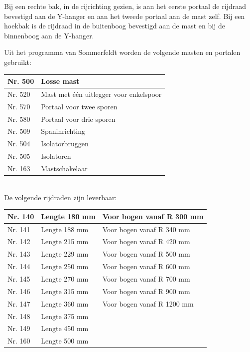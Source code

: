 \documentclass[12pt,a4paper]{report}
\begin{document}
Bij een rechte bak, in de rijrichting gezien, is aan het eerste portaal de rijdraad bevestigd aan de Y-hanger en aan het tweede portaal aan de mast zelf.
Bij een hoekbak is de rijdraad in de buitenboog bevestigd aan de mast en bij de binnenboog aan de Y-hanger.

Uit het programma van Sommerfeldt worden de volgende masten en portalen gebruikt:

\begin{tabular}{| l |p{8cm}|}
\hline
\cellcolor[gray]{0.84}Nr. 500&Losse mast\\
\hline
\cellcolor[gray]{0.84}Nr. 520&Mast met \'{e}\'{e}n uitlegger voor enkelspoor\\
\hline
\cellcolor[gray]{0.84}Nr. 570&Portaal voor twee sporen\\
\hline
\cellcolor[gray]{0.84}Nr. 580&Portaal voor drie sporen\\
\hline
\cellcolor[gray]{0.84}Nr. 509&Spaninrichting\\
\hline
\cellcolor[gray]{0.84}Nr. 504&Isolatorbruggen\\
\hline
\cellcolor[gray]{0.84}Nr. 505&Isolatoren\\
\hline
\cellcolor[gray]{0.84}Nr. 163&Mastschakelaar\\
\hline
\end{tabular}
\\

De volgende rijdraden zijn leverbaar:

\begin{tabular}{| l | l | l |}
\hline
\cellcolor[gray]{0.84}Nr. 140&Lengte 180 mm&Voor bogen vanaf R 300 mm\\
\hline
\cellcolor[gray]{0.84}Nr. 141&Lengte 188 mm&Voor bogen vanaf R 340 mm\\
\hline
\cellcolor[gray]{0.84}Nr. 142&Lengte 215 mm&Voor bogen vanaf R 420 mm\\
\hline
\cellcolor[gray]{0.84}Nr. 143&Lengte 229 mm&Voor bogen vanaf R 500 mm\\
\hline
\cellcolor[gray]{0.84}Nr. 144&Lengte 250 mm&Voor bogen vanaf R 600 mm\\
\hline
\cellcolor[gray]{0.84}Nr. 145&Lengte 270 mm&Voor bogen vanaf R 700 mm\\
\hline
\cellcolor[gray]{0.84}Nr. 146&Lengte 315 mm&Voor bogen vanaf R 900 mm\\
\hline
\cellcolor[gray]{0.84}Nr. 147&Lengte 360 mm&Voor bogen vanaf R 1200 mm\\
\hline
\cellcolor[gray]{0.84}Nr. 148&Lengte 375 mm&\\
\hline
\cellcolor[gray]{0.84}Nr. 149&Lengte 450 mm&\\
\hline
\cellcolor[gray]{0.84}Nr. 160&Lengte 500 mm&\\
\hline
\end{tabular}
\end{document}
